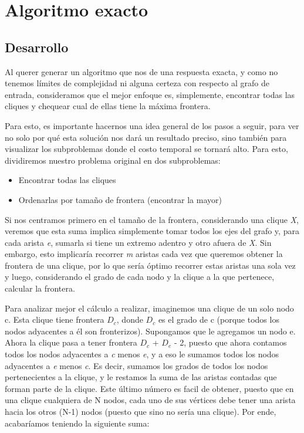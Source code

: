 \newcommand{\tikzcircle}[1][red,fill=red]{\tikz[baseline=-0.5ex]\draw[#1,radius=2pt] (0,0) circle ;}

\section{Algoritmo exacto}
\subsection{Desarrollo}
Al querer generar un algoritmo que nos de una respuesta exacta, y como no tenemos límites de complejidad ni alguna certeza con respecto al grafo de entrada, consideramos que el mejor enfoque es, simplemente, encontrar todas las cliques y chequear cual de ellas tiene la máxima frontera.

Para esto, es importante hacernos una idea general de los pasos a seguir, para ver no solo por qué esta solución nos dará un resultado preciso, sino también para visualizar los subproblemas donde el costo temporal se tornará alto. Para esto, dividiremos nuestro problema original en dos subproblemas:
\begin{itemize}
	\item Encontrar todas las cliques
	
	\item Ordenarlas por tamaño de frontera (encontrar la mayor)

\end{itemize}

Si nos centramos primero en el tamaño de la frontera, considerando una clique \textit{X}, veremos que esta suma implica simplemente tomar todos los ejes del grafo y, para cada arista \textit{e}, sumarla si tiene un extremo adentro y otro afuera de \textit{X}. Sin embargo, esto implicaría recorrer \textit{m} aristas cada vez que queremos obtener la frontera de una clique, por lo que sería óptimo recorrer estas aristas una sola vez y luego, considerando el grado de cada nodo y la clique a la que pertenece, calcular la frontera.

Para analizar mejor el cálculo a realizar, imaginemos una clique de un solo nodo c. Esta clique tiene frontera ${D_c}$, donde ${D_c}$ es el grado de c (porque todos los nodos adyacentes a él son fronterizos). Supongamos que le agregamos un nodo e. Ahora la clique pasa a tener frontera ${D_c}$ + ${D_e}$ - 2, puesto que ahora contamos todos los nodos adyacentes a \textit{c} menos \textit{e}, y a eso le sumamos todos los nodos adyacentes a \textit{e} menos \textit{c}. Es decir, sumamos los grados de todos los nodos pertenecientes a la clique, y le restamos la suma de las aristas contadas que forman parte de la clique. Este último número es facil de obtener, puesto que en una clique cualquiera de N nodos, cada uno de sus vértices debe tener una arista hacia los otros (N-1) nodos (puesto que sino no sería una clique). Por ende, acabaríamos teniendo la siguiente suma:

